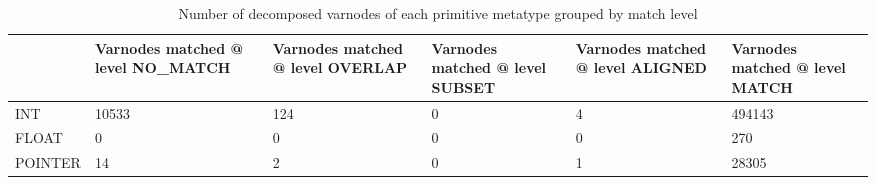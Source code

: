 \begin{table}[t]
\centering
\caption{Number of decomposed varnodes of each primitive metatype grouped by match level}
\label{table:metatype-match-levels-decomposed}
\begin{tabular}{lp{3.6cm}p{3.6cm}p{3.6cm}p{3.6cm}p{3.6cm}}
\toprule
{} &  Varnodes matched @ level NO\_MATCH &  Varnodes matched @ level OVERLAP &  Varnodes matched @ level SUBSET &  Varnodes matched @ level ALIGNED &  Varnodes matched @ level MATCH \\
\midrule
INT     &                              10533 &                               124 &                                0 &                                 4 &                          494143 \\
FLOAT   &                                  0 &                                 0 &                                0 &                                 0 &                             270 \\
POINTER &                                 14 &                                 2 &                                0 &                                 1 &                           28305 \\
\bottomrule
\end{tabular}
\end{table}

